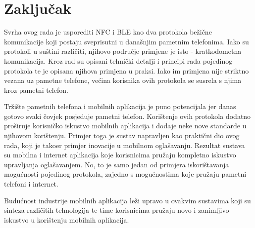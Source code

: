 \chapter{Zaklju\v{c}ak}

Svrha ovog rada je usporediti NFC i BLE kao dva protokola be\v{z}i\v{c}ne komunikacije koji postaju sveprisutni u dana\v{s}njim pametnim telefonima. Iako su protokoli u su\v{s}tini razli\v{c}iti, njihovo podru\v{c}je primjene je isto - kratkodometna komunikacija. Kroz rad su opisani tehni\v{c}ki detalji i principi rada pojedinog protokola te je opisana njihova primjena u praksi.
Iako im primjena nije striktno vezana uz pametne telefone, ve\'{c}ina korisnika ovih protokola se susrela s njima kroz pametni telefon. 

Tr\v{z}i\v{s}te pametnih telefona i mobilnih aplikacija je puno potencijala jer danas gotovo svaki \v{c}ovjek posjeduje pametni telefon. Kori\v{s}tenje ovih protokola dodatno pro\v{s}iruje korisni\v{c}ko iskustvo mobilnih aplikacija i dodaje neke nove standarde u njihovom kori\v{s}tenju. Primjer toga je sustav napravljen kao prakti\v{c}ni dio ovog rada, koji je tako\dj er primjer inovacije u mobilnom ogla\v{s}avanju. Rezultat sustava su mobilna i internet aplikacija koje korisnicima pru\v{z}aju kompletno iskustvo upravljanja ogla\v{s}avanjem. No, to je samo jedan od primjera iskori\v{s}tavanja mogu\'{c}nosti pojedinog protokola, zajedno s mogu\'{c}nostima koje pru\v{z}aju pametni telefoni i internet.

Budu\'{c}nost industrije mobilnih aplikacija le\v{z}i upravo u ovakvim sustavima koji su sinteza razli\v{c}itih tehnologija te time korisnicima pru\v{z}aju novo i zanimljivo iskustvo u kori\v{s}tenju mobilnih aplikacija.
